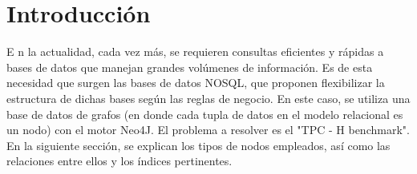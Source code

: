 \documentclass[10pt,journal,compsoc]{IEEEtran}
\begin{document}
\IEEEpeerreviewmaketitle
\section{Introducci\'on}


\lettrine{E}{ }n la actualidad, cada vez m\'as, se requieren consultas eficientes y r\'apidas a bases de datos que manejan grandes vol\'umenes de informaci\'on. Es de esta necesidad que surgen las bases de datos NOSQL, que proponen flexibilizar la estructura de dichas bases seg\'un las reglas de negocio. En este caso, se utiliza una base de datos de grafos (en donde cada tupla de datos en el modelo relacional es un nodo) con el motor Neo4J. El problema a resolver es el "TPC - H benchmark".\\
En la siguiente secci\'on,  se explican los tipos de nodos empleados, as\'i como las relaciones entre ellos y los \'indices pertinentes.

\end{document}
